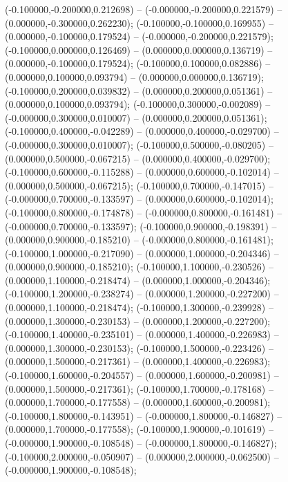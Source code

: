  (-0.100000,-0.200000,0.212698) -- (-0.000000,-0.200000,0.221579) -- (0.000000,-0.300000,0.262230);
 (-0.100000,-0.100000,0.169955) -- (0.000000,-0.100000,0.179524) -- (-0.000000,-0.200000,0.221579);
 (-0.100000,0.000000,0.126469) -- (0.000000,0.000000,0.136719) -- (0.000000,-0.100000,0.179524);
 (-0.100000,0.100000,0.082886) -- (0.000000,0.100000,0.093794) -- (0.000000,0.000000,0.136719);
 (-0.100000,0.200000,0.039832) -- (0.000000,0.200000,0.051361) -- (0.000000,0.100000,0.093794);
 (-0.100000,0.300000,-0.002089) -- (-0.000000,0.300000,0.010007) -- (0.000000,0.200000,0.051361);
 (-0.100000,0.400000,-0.042289) -- (0.000000,0.400000,-0.029700) -- (-0.000000,0.300000,0.010007);
 (-0.100000,0.500000,-0.080205) -- (0.000000,0.500000,-0.067215) -- (0.000000,0.400000,-0.029700);
 (-0.100000,0.600000,-0.115288) -- (0.000000,0.600000,-0.102014) -- (0.000000,0.500000,-0.067215);
 (-0.100000,0.700000,-0.147015) -- (-0.000000,0.700000,-0.133597) -- (0.000000,0.600000,-0.102014);
 (-0.100000,0.800000,-0.174878) -- (-0.000000,0.800000,-0.161481) -- (-0.000000,0.700000,-0.133597);
 (-0.100000,0.900000,-0.198391) -- (0.000000,0.900000,-0.185210) -- (-0.000000,0.800000,-0.161481);
 (-0.100000,1.000000,-0.217090) -- (0.000000,1.000000,-0.204346) -- (0.000000,0.900000,-0.185210);
 (-0.100000,1.100000,-0.230526) -- (0.000000,1.100000,-0.218474) -- (0.000000,1.000000,-0.204346);
 (-0.100000,1.200000,-0.238274) -- (0.000000,1.200000,-0.227200) -- (0.000000,1.100000,-0.218474);
 (-0.100000,1.300000,-0.239928) -- (0.000000,1.300000,-0.230153) -- (0.000000,1.200000,-0.227200);
 (-0.100000,1.400000,-0.235101) -- (0.000000,1.400000,-0.226983) -- (0.000000,1.300000,-0.230153);
 (-0.100000,1.500000,-0.223426) -- (0.000000,1.500000,-0.217361) -- (0.000000,1.400000,-0.226983);
 (-0.100000,1.600000,-0.204557) -- (0.000000,1.600000,-0.200981) -- (0.000000,1.500000,-0.217361);
 (-0.100000,1.700000,-0.178168) -- (0.000000,1.700000,-0.177558) -- (0.000000,1.600000,-0.200981);
 (-0.100000,1.800000,-0.143951) -- (-0.000000,1.800000,-0.146827) -- (0.000000,1.700000,-0.177558);
 (-0.100000,1.900000,-0.101619) -- (-0.000000,1.900000,-0.108548) -- (-0.000000,1.800000,-0.146827);
 (-0.100000,2.000000,-0.050907) -- (0.000000,2.000000,-0.062500) -- (-0.000000,1.900000,-0.108548);
